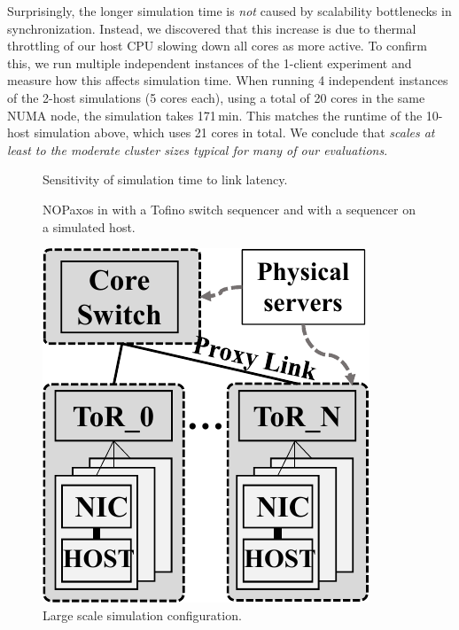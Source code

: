 Surprisingly, the longer simulation time is \emph{not} caused by scalability
bottlenecks in \sysname synchronization.
%
Instead, we discovered that this increase is due to thermal
throttling of our host CPU slowing down all cores as more active.
%
To confirm this, we run multiple independent instances of the
1-client experiment and measure how this affects simulation time.
%
When running 4 independent instances of the 2-host simulations (5
cores each), using a total of 20 cores in the same NUMA node, the
simulation takes 171\,min.
%
This matches the runtime of the 10-host simulation above, which uses
21 cores in total.
%
We conclude that \emph{\sysname scales at least to the moderate
cluster sizes typical for many of our evaluations}.


\begin{figure}%
\centering%
\begin{minipage}{0.28\textwidth}%
\centering%
%
\caption{Sensitivity of \sysname simulation time to link latency.}%
\label{fig:pcilat}%
\end{minipage}%
\hfill%
\begin{minipage}{0.45\textwidth}%
\centering%
%
\caption{NOPaxos in \sysname with a Tofino switch sequencer and with a
    sequencer on a simulated host.}%
\label{fig:nopaxos-seq}%
\end{minipage}%
\hfill%
\begin{minipage}{0.2\textwidth}%
\centering%
\vspace{4mm}
\includegraphics[width=0.8\linewidth]{figures/large_scale.pdf}
\vspace{8mm}
\caption{Large scale simulation configuration.}
\label{fig:largescale-config}
\end{minipage}%
\end{figure}
